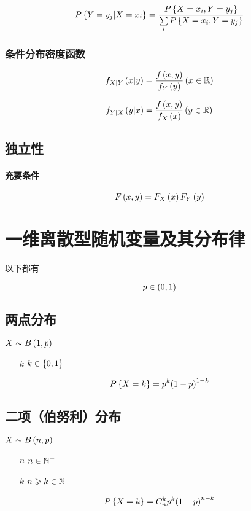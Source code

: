 \documentclass{article}
\begin{document}
\[P\left\{Y=y_j|X=x_i\right\}=\frac{P\left\{X=x_i,Y=y_j\right\}}{\sum\limits_iP\left\{X=x_i,Y=y_j\right\}}\]

\subsubsection{条件分布密度函数}

\[f_{X|Y}\left(x|y\right)=\frac{f\left(x,y\right)}{f_Y\left(y\right)}\left(x\in\mathbb R\right)\]

\[f_{Y|X}\left(y|x\right)=\frac{f\left(x,y\right)}{f_X\left(x\right)}\left(y\in\mathbb R\right)\]

\subsection{独立性}

\paragraph{充要条件}

\[F\left(x,y\right)=F_X\left(x\right)F_Y\left(y\right)\]

\section{一维离散型随机变量及其分布律}

以下都有

\[p\in\left(0,1\right)\]

\subsection{两点分布}

$X\sim B\left(1,p\right)$

\begin{enumerate}
    \item [$k$] $k\in\left\{0,1\right\}$
\end{enumerate}

\[P\left\{X=k\right\}=p^k{\left(1-p\right)}^{1-k}\]

\subsection{二项（伯努利）分布}

$X\sim B\left(n,p\right)$

\begin{enumerate}
    \item [$n$] $n\in\mathbb N^+$
    \item [$k$] $n\geqslant k\in\mathbb N$
\end{enumerate}

\[P\left\{X=k\right\}=C_n^kp^k{\left(1-p\right)}^{n-k}\]
\end{document}
